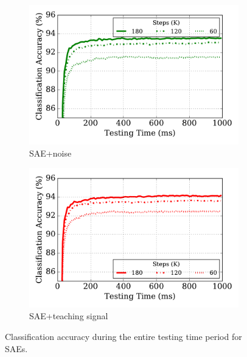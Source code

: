 \begin{figure}
\begin{subfigure}[t]{0.4\textwidth}
		\includegraphics[width=\textwidth]{pics_sdlm/42_MNIST_SAE_noise/latency.pdf}
		\caption{SAE+noise}
	\end{subfigure}
	\begin{subfigure}[t]{0.4\textwidth}
		\includegraphics[width=\textwidth]{pics_sdlm/43_MNIST_SAE_all/latency.pdf}
		\caption{SAE+teaching signal}
	\end{subfigure}
	\caption{Classification accuracy during the entire testing time period for SAEs.}
\end{figure}


